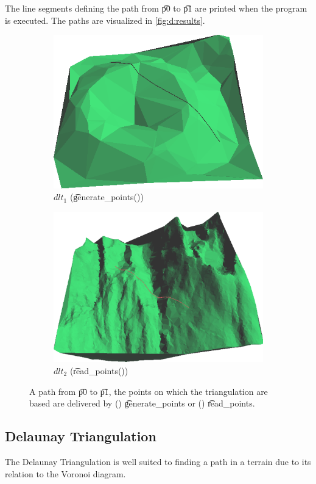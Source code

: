 		

		

		The line segments defining the path from \t{p0} to \t{p1} are printed when the program is executed. The paths are visualized in \autoref{fig:d:results}.

		\begin{figure}
			\centering
			\begin{subfigure}[b]{0.495\textwidth}
				\centering
				\includegraphics[width=\textwidth]{./img/d_result1}
				\caption{$dlt_1$ (\t{generate_points()})}
				\label{subfig:d:result1}
			\end{subfigure}
			\begin{subfigure}[b]{0.495\textwidth}
				\centering
				\includegraphics[width=\textwidth]{./img/d_result2}
				\caption{$dlt_2$ (\t{read_points()})}
				\label{subfig:d:result2}
			\end{subfigure}	
			\caption{A path from \t{p0} to \t{p1}, the points on which the triangulation are based are delivered by () \t{generate_points} or () \t{read_points}.}
			\label{fig:d:results}
		\end{figure}

\subsection*{Delaunay Triangulation}
	The Delaunay Triangulation is well suited to finding a path in a terrain due to its relation to the Voronoi diagram.